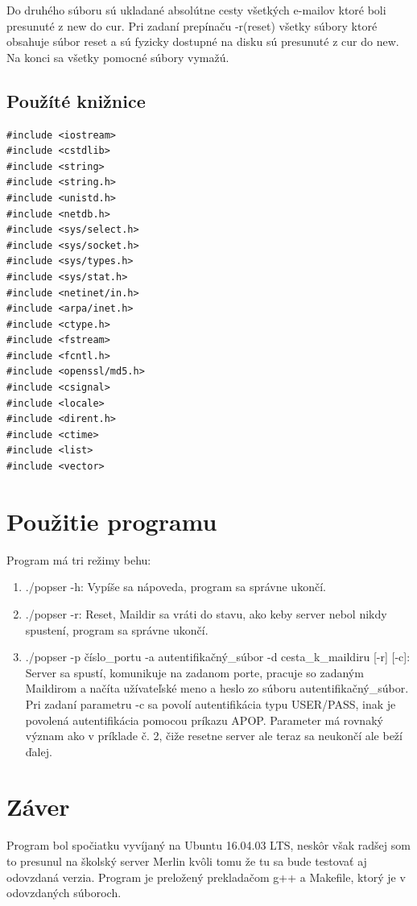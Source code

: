 \documentclass[11pt,a4paper]{article}
\begin{document}
Do druhého súboru sú ukladané absolútne cesty všetkých e-mailov ktoré boli presunuté z new do cur. Pri zadaní prepínaču -r(reset) všetky súbory ktoré obsahuje súbor reset a sú fyzicky dostupné na disku sú presunuté z cur do new. Na konci sa všetky pomocné súbory vymažú.



\subsection{Použíté knižnice} 
\begin{lstlisting}
#include <iostream>
#include <cstdlib>
#include <string>
#include <string.h>
#include <unistd.h>
#include <netdb.h>
#include <sys/select.h>
#include <sys/socket.h>
#include <sys/types.h>
#include <sys/stat.h>
#include <netinet/in.h>
#include <arpa/inet.h>
#include <ctype.h>
#include <fstream>
#include <fcntl.h>
#include <openssl/md5.h>
#include <csignal>
#include <locale> 
#include <dirent.h>
#include <ctime>
#include <list>
#include <vector>
\end{lstlisting}


\section{Použitie programu}
Program má tri režimy behu:
\begin{enumerate}
  \item ./popser -h: Vypíše sa nápoveda, program sa správne ukončí.
  \item ./popser -r: Reset, Maildir sa vráti do stavu, ako keby server nebol nikdy spustení, program sa správne ukončí.
  \item ./popser -p číslo\_portu -a autentifikačný\_súbor -d  cesta\_k\_maildiru [-r] [-c]: Server sa spustí, komunikuje na zadanom porte, pracuje so zadaným Maildirom a načíta užívateľské meno a heslo zo súboru autentifikačný\_súbor. Pri zadaní parametru -c sa povolí autentifikácia typu USER/PASS, inak je povolená autentifikácia pomocou príkazu APOP. Parameter má rovnaký význam ako v príklade č. 2, čiže resetne server ale teraz sa neukončí ale beží ďalej.
\end{enumerate}



\section{Záver}
Program bol spočiatku vyvíjaný na Ubuntu 16.04.03 LTS, neskôr však radšej som to presunul na školský server Merlin kvôli tomu že tu sa bude testovať aj odovzdaná verzia.
Program je preložený prekladačom g++ a Makefile, ktorý je v odovzdaných súboroch. 


\newpage


\makeatletter
\makeatother


\begin{flushleft}

\end{flushleft}
\end{document}
